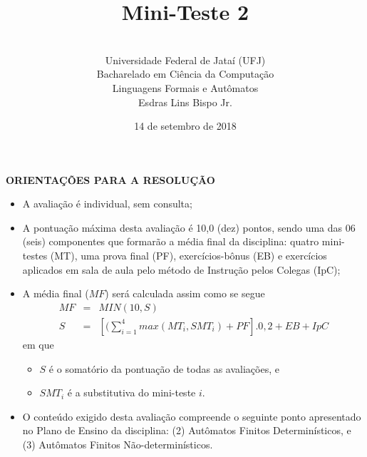 \documentclass[12pt,a4paper,oneside]{article}
\author{\\Universidade Federal de Jataí (UFJ)\\Bacharelado em Ciência da Computação \\Linguagens Formais e Autômatos \\Esdras Lins Bispo Jr.}
\date{14 de setembro de 2018}
\title{\sc \huge Mini-Teste 2}
\begin{document}
\maketitle

{\bf ORIENTAÇÕES PARA A RESOLUÇÃO}

\small
 
\begin{itemize}
	\item A avaliação é individual, sem consulta;
	\item A pontuação máxima desta avaliação é 10,0 (dez) pontos, sendo uma das 06 (seis) componentes que formarão a média final da disciplina: quatro mini-testes (MT), uma prova final (PF), exercícios-bônus (EB) e exercícios aplicados em sala de aula pelo método de Instrução pelos Colegas (IpC);
	\item A média final ($MF$) será calculada assim como se segue
	\begin{eqnarray}
		MF & = & MIN(10, S) \nonumber \\
		S & = & [(\sum_{i=1}^{4} max(MT_i, SMT_i ) + PF].0,2  + EB + IpC\nonumber
	\end{eqnarray}
	em que 
	\begin{itemize}
		\item $S$ é o somatório da pontuação de todas as avaliações, e
		\item $SMT_i$ é a substitutiva do mini-teste $i$.
	\end{itemize}
	\item O conteúdo exigido desta avaliação compreende o seguinte ponto apresentado no Plano de Ensino da disciplina: (2) Autômatos Finitos Determinísticos, e (3) Autômatos Finitos Não-determinísticos.
\end{itemize}

\begin{center}
\end{center}

\newpage
\end{document}
